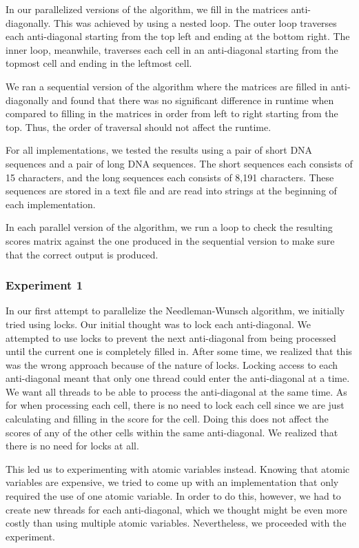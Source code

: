 \documentclass[conference]{IEEEtran}
\begin{document}
In our parallelized versions of the algorithm, we fill in the matrices anti-diagonally. This was achieved by using a nested loop. The outer loop traverses each anti-diagonal starting from the top left and ending at the bottom right. The inner loop, meanwhile, traverses each cell in an anti-diagonal starting from the topmost cell and ending in the leftmost cell.

We ran a sequential version of the algorithm where the matrices are filled in anti-diagonally and found that there was no significant difference in runtime when compared to filling in the matrices in order from left to right starting from the top. Thus, the order of traversal should not affect the runtime.

For all implementations, we tested the results using a pair of short DNA sequences and a pair of long DNA sequences. The short sequences each consists of 15 characters, and the long sequences each consists of 8,191 characters. These sequences are stored in a text file and are read into strings at the beginning of each implementation.

In each parallel version of the algorithm, we run a loop to check the resulting scores matrix against the one produced in the sequential version to make sure that the correct output is produced.

\subsubsection{Experiment 1}
In our first attempt to parallelize the Needleman-Wunsch algorithm, we initially tried using locks. Our initial thought was to lock each anti-diagonal. We attempted to use locks to prevent the next anti-diagonal from being processed until the current one is completely filled in. After some time, we realized that this was the wrong approach because of the nature of locks. Locking access to each anti-diagonal meant that only one thread could enter the anti-diagonal at a time. We want all threads to be able to process the anti-diagonal at the same time. As for when processing each cell, there is no need to lock each cell since we are just calculating and filling in the score for the cell. Doing this does not affect the scores of any of the other cells within the same anti-diagonal. We realized that there is no need for locks at all.

This led us to experimenting with atomic variables instead. Knowing that atomic variables are expensive, we tried to come up with an implementation that only required the use of one atomic variable. In order to do this, however, we had to create new threads for each anti-diagonal, which we thought might be even more costly than using multiple atomic variables. Nevertheless, we proceeded with the experiment.
\end{document}

